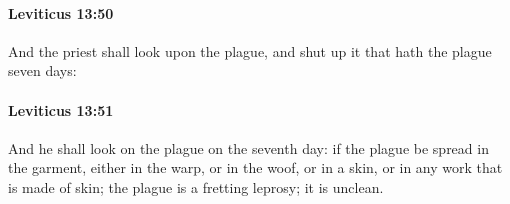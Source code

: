 		\paragraph{Leviticus 13:50} %
			\label{LEVITICUS-13-50}

			And the priest shall look upon the plague, and shut up it that hath the plague seven days:


		\paragraph{Leviticus 13:51} %
			\label{LEVITICUS-13-51}

			And he shall look on the plague on the seventh day: if the plague be spread in the garment, either in the warp, or in the woof, or in a skin, or in any work that is made of skin; the plague is a fretting leprosy; it is unclean.


